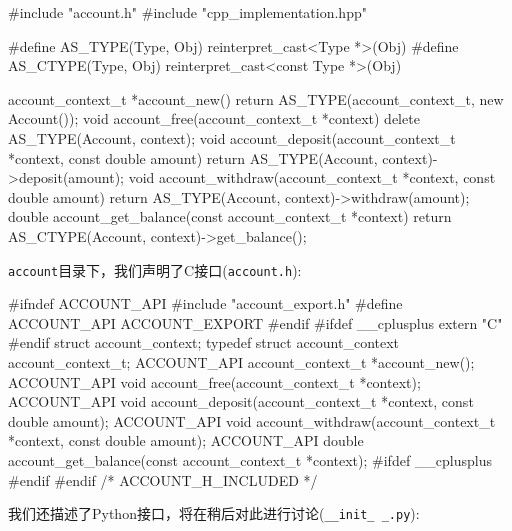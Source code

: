 \begin{codebox}[cpp]
#include "account.h"
#include "cpp_implementation.hpp"

#define AS_TYPE(Type, Obj) reinterpret_cast<Type *>(Obj)
#define AS_CTYPE(Type, Obj) reinterpret_cast<const Type *>(Obj)

account_context_t *account_new()
{
  return AS_TYPE(account_context_t, new Account());
}
void account_free(account_context_t *context) { delete AS_TYPE(Account, context); }
void account_deposit(account_context_t *context, const double amount)
{
  return AS_TYPE(Account, context)->deposit(amount);
}
void account_withdraw(account_context_t *context, const double amount)
{
  return AS_TYPE(Account, context)->withdraw(amount);
}
double account_get_balance(const account_context_t *context)
{
  return AS_CTYPE(Account, context)->get_balance();
}
\end{codebox}

\texttt{account}目录下，我们声明了C接口(\texttt{account.h}):

\begin{codebox}[cpp]
#ifndef ACCOUNT_API
#include "account_export.h"
#define ACCOUNT_API ACCOUNT_EXPORT
#endif
#ifdef __cplusplus
extern "C"
{
#endif
  struct account_context;
  typedef struct account_context account_context_t;
  ACCOUNT_API
  account_context_t *account_new();
  ACCOUNT_API
  void account_free(account_context_t *context);
  ACCOUNT_API
  void account_deposit(account_context_t *context, const double amount);
  ACCOUNT_API
  void account_withdraw(account_context_t *context, const double amount);
  ACCOUNT_API
  double account_get_balance(const account_context_t *context);
#ifdef __cplusplus
}
#endif
#endif /* ACCOUNT_H_INCLUDED */
\end{codebox}

我们还描述了Python接口，将在稍后对此进行讨论(\texttt{\_\_init\_ \_.py}):

